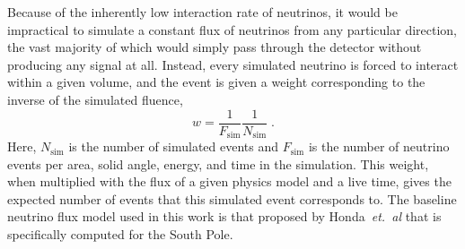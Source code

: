 Because of the inherently low interaction rate of neutrinos, it would be impractical to simulate a constant flux of neutrinos from any particular direction, the vast majority of which would simply pass through the detector without producing any signal at all.
Instead, every simulated neutrino is forced to interact within a given volume, and the event is given a weight corresponding to the inverse of the simulated fluence,
\begin{equation}
    w = \frac{1}{F_{\mathrm{sim}}} \frac{1}{N_{\mathrm{sim}}}\;.
\end{equation}
Here, $N_{\mathrm{sim}}$ is the number of simulated events and $F_{\mathrm{sim}}$ is the number of neutrino events per area, solid angle, energy, and time in the simulation.
This weight, when multiplied with the flux of a given physics model and a live time, gives the expected number of events that this simulated event corresponds to.
The baseline neutrino flux model used in this work is that proposed by Honda~\emph{et.~al} that is specifically computed for the South Pole.

